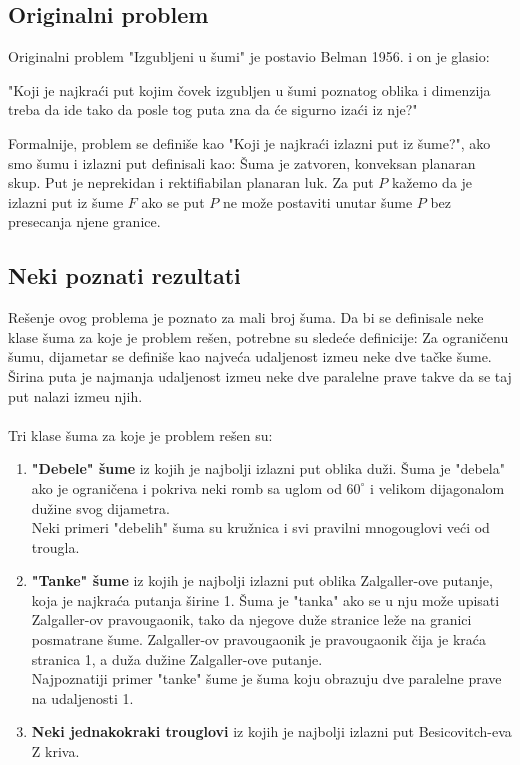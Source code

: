 \documentclass[11pt,letter]{article}
\begin{document}
\subsection[Originalni problem]{Originalni problem}
\bigskip
Originalni problem "Izgubljeni u \v sumi" je postavio Belman 1956. i on je glasio:
\begin{center}
"Koji je najkra\' ci put kojim \v covek izgubljen u \v sumi poznatog oblika i dimenzija treba da ide tako da posle tog puta zna da \' ce sigurno iza\' ci iz nje?"
\end{center}
\indent Formalnije, problem se defini\v se kao "Koji je najkra\' ci izlazni put iz \v sume?", ako smo \v sumu i izlazni put definisali kao:
\df \v Suma je zatvoren, konveksan planaran skup.
\df Put je neprekidan i rektifiabilan planaran luk.
\df Za put $P$ ka\v zemo da je izlazni put iz \v sume $F$ ako se put $P$ ne mo\v ze postaviti unutar \v sume $P$ bez presecanja njene granice.  
\subsection[Neki poznati rezultati]{Neki poznati rezultati}
\bigskip
Re\v senje ovog problema je poznato za mali broj \v suma. Da bi se definisale neke klase \v suma za koje je problem re\v sen, potrebne su slede\' ce definicije:
\df Za ograni\v cenu \v sumu, dijametar se defini\v se kao najve\' ca udaljenost izme\dj u neke dve ta\v cke \v sume.
\df \v Sirina puta je najmanja udaljenost izme\dj u neke dve paralelne prave takve da se taj put nalazi izme\dj u njih.
\\
\bigskip
\\
Tri klase \v suma za koje je problem re\v sen su:
\begin{enumerate}
\item \textbf{"Debele" \v sume} iz kojih je najbolji izlazni put oblika du\v zi. \v Suma je "debela" ako je ograni\v cena i pokriva neki romb sa uglom od $60^\circ$ i velikom dijagonalom du\v zine svog dijametra.
\\
Neki primeri  "debelih" \v suma su kru\v znica i svi pravilni mnogouglovi ve\' ci od trougla.
\item \textbf{"Tanke" \v sume} iz kojih je najbolji izlazni put oblika Zalgaller-ove putanje, koja je najkra\' ca putanja \v sirine 1. \v Suma je "tanka" ako se u nju mo\v ze upisati Zalgaller-ov pravougaonik, tako da njegove du\v ze stranice le\v ze na granici posmatrane \v sume. Zalgaller-ov pravougaonik je pravougaonik \v cija je kra\' ca stranica 1, a du\v za du\v zine Zalgaller-ove putanje.
\\
Najpoznatiji primer "tanke" \v sume je \v suma koju obrazuju dve paralelne prave na udaljenosti 1.
\item \textbf{Neki jednakokraki trouglovi} iz kojih je najbolji izlazni put Besicovitch-eva Z kriva.
\end{enumerate}
\end{document}
